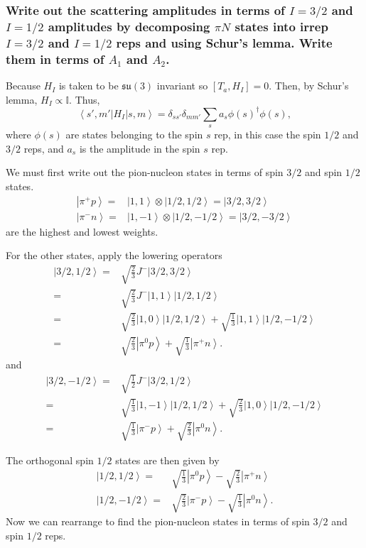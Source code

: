 \documentclass[main.tex]{subfiles}
\begin{document}
\subsubsection{Write out the scattering amplitudes in terms of $I=3/2$ and $I=1/2$ amplitudes by decomposing $\pi N$ states into irrep $I=3/2$ and $I=1/2$ reps and using Schur's lemma. Write them in terms of $A_1$ and $A_2$.}
Because $H_I$ is taken to be $\mathfrak{su}(3)$ invariant so $[T_a,H_I]=0$. Then, by Schur's lemma, $H_I\propto\mathbb{I}$. Thus, 
\begin{equation}\label{eq:10scatamp}
\left<s',m'|H_I|s,m\right>=\delta_{ss'}\delta_{mm'}\sum_sa_s\phi(s)^{\dagger}\phi(s),
\end{equation} 
where $\phi(s)$ are states belonging to the spin $s$ rep, in this case the spin $1/2$ and $3/2$ reps, and $a_s$ is the amplitude in the spin $s$ rep.

We must first write out the pion-nucleon states in terms of spin $3/2$ and spin $1/2$ states.
\begin{align}
\left|\pi^+p\right>=&\left|1,1\right>\otimes\left|1/2,1/2\right>=\left|3/2,3/2\right>\\ \left|\pi^-n\right>=&\left|1,-1\right>\otimes\left|1/2,-1/2\right>=\left|3/2,-3/2\right>
\end{align}
are the highest and lowest weights.

For the other states, apply the lowering operators
\begin{align}
\left|3/2,1/2\right>=&\sqrt{\frac{2}{3}}J^-\left|3/2,3/2\right>\\
=&\sqrt{\frac{2}{3}}J^-\left|1,1\right>\left|1/2,1/2\right>\\
=&\sqrt{\frac{2}{3}}\left|1,0\right>\left|1/2,1/2\right>+\sqrt{\frac{1}{3}}\left|1,1\right>\left|1/2,-1/2\right>\\
=&\sqrt{\frac{2}{3}}\left|\pi^0p\right>+\sqrt{\frac{1}{3}}\left|\pi^+n\right>.
\end{align}
and
\begin{align}
\left|3/2,-1/2\right>=&\sqrt{\frac{1}{2}}J^-\left|3/2,1/2\right>\\
=&\sqrt{\frac{1}{3}}\left|1,-1\right>\left|1/2,1/2\right>+\sqrt{\frac{2}{3}}\left|1,0\right>\left|1/2,-1/2\right>\\
=&\sqrt{\frac{1}{3}}\left|\pi^-p\right>+\sqrt{\frac{2}{3}}\left|\pi^0n\right>.
\end{align}

The orthogonal spin $1/2$ states are then given by
\begin{align}
\left|1/2,1/2\right>=&\sqrt{\frac{1}{3}}\left|\pi^0p\right>-\sqrt{\frac{2}{3}}\left|\pi^+n\right>\\
\left|1/2,-1/2\right>=&\sqrt{\frac{2}{3}}\left|\pi^-p\right>-\sqrt{\frac{1}{3}}\left|\pi^0n\right>.
\end{align}
Now we can rearrange to find the pion-nucleon states in terms of spin $3/2$ and spin $1/2$ reps.
\end{document}
